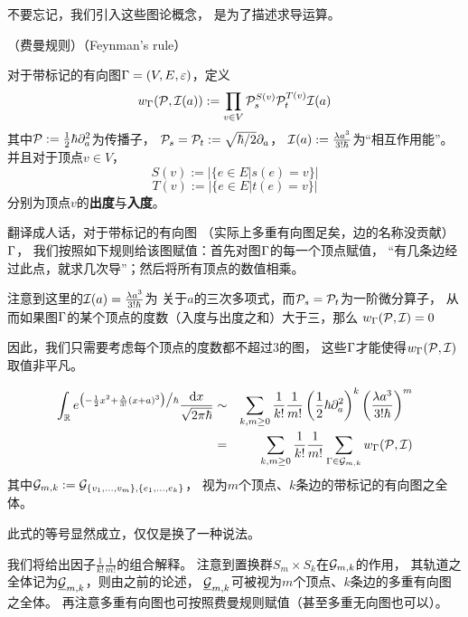 不要忘记，我们引入这些图论概念，
是为了描述求导运算。

\begin{notation}（费曼规则）（Feynman's rule）

对于带标记的有向图$\Gamma=(V,E,\varepsilon)$，定义
$$
     w_{\Gamma}(\mathcal{P},\mathcal{I}(a))
:=
     \prod_{v\in V}
     \mathcal{P}_s^{S(v)}
     \mathcal{P}_t^{T(v)}
     \mathcal{I}(a)
$$
其中$\mathcal{P}:=\frac{1}{2}\hbar\partial_a^2$为传播子，
$\mathcal{P}_s=\mathcal{P}_t:=\sqrt{\hbar/2}\partial_a$，
$\mathcal{I}(a):=\frac{\lambda a^3}{3!\hbar}$为“相互作用能”。
并且对于顶点$v\in V$，
$$S(v):=|\{e\in E|s(e)=v\}|$$
$$T(v):=|\{e\in E|t(e)=v\}|$$
分别为顶点$v$的\textbf{出度}与\textbf{入度}。
\end{notation}

翻译成人话，对于带标记的有向图
（实际上多重有向图足矣，边的名称没贡献）$\Gamma$，
我们按照如下规则给该图赋值：首先对图$\Gamma$的每一个顶点赋值，
“有几条边经过此点，就求几次导”；然后将所有顶点的数值相乘。

\begin{example}注意到这里的$\mathcal{I}(a)=\frac{\lambda a^3}{3!\hbar}$为
关于$a$的三次多项式，而$\mathcal{P}_s=\mathcal{P}_t$为一阶微分算子，
从而如果图$\Gamma$的某个顶点的度数（入度与出度之和）大于三，那么
$w_\Gamma(\mathcal{P},\mathcal{I})=0$
\end{example}
因此，我们只需要考虑每个顶点的度数都不超过$3$的图，
这些$\Gamma$才能使得$w_\Gamma(\mathcal{P},\mathcal{I})$取值非平凡。


\begin{lemma}
\begin{eqnarray*}
     \int_{\mathbb{R}}
       e^{\big(
            -\frac{1}{2}x^2
            +\frac{\lambda}{3!}(x+a)^3
          \big)
          \big/\hbar}
       \frac{\mathrm{d} x}{\sqrt{2\pi\hbar}}
&\sim&
     \sum_{k,m\geq 0}
       \frac{1}{k!}
       \frac{1}{m!}
       \left(
         \frac{1}{2}\hbar\partial_a^2
       \right)^k
       \left(
         \frac{\lambda a^3}{3!\hbar}
       \right)^m\\
&=&
     \sum_{k,m\geq 0}
       \frac{1}{k!}
       \frac{1}{m!}
       \sum_{\Gamma\in\mathcal{G}_{m,k}}
         w_\Gamma(\mathcal{P},\mathcal{I})
\end{eqnarray*}
其中$\mathcal{G}_{m,k}:=\mathcal{G}_{\{v_1,...,v_m\},\{e_1,...,e_k\}}$，
视为$m$个顶点、$k$条边的带标记的有向图之全体。
\end{lemma}
此式的等号显然成立，仅仅是换了一种说法。

我们将给出因子$\frac{1}{k!}\frac{1}{m!}$的组合解释。
注意到置换群$S_m\times S_k$在$\mathcal{G}_{m,k}$的作用，
其轨道之全体记为$\underline{\mathcal{G}}_{m,k}$，则由之前的论述，
$\underline{\mathcal{G}}_{m,k}$可被视为$m$个顶点、$k$条边的多重有向图之全体。
再注意多重有向图也可按照费曼规则赋值（甚至多重无向图也可以）。

